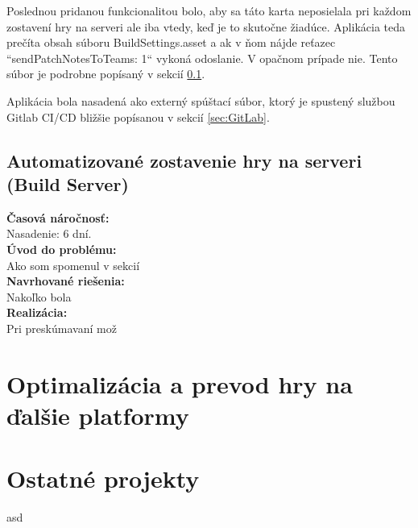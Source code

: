 \documentclass[slovak, bachelorpractice]{diploma}
\begin{document}
Poslednou pridanou funkcionalitou bolo, aby sa táto karta neposielala pri každom zostavení hry na serveri ale iba vtedy, keď je to skutočne žiadúce. Aplikácia teda prečíta obsah súboru BuildSettings.asset a ak v ňom nájde reťazec ``sendPatchNotesToTeams: 1`` vykoná odoslanie. V opačnom prípade nie. Tento súbor je podrobne popísaný v sekcií \ref{sec:BuildServer}.

Aplikácia bola nasadená ako externý spúštací súbor, ktorý je spustený službou Gitlab CI/CD bližšie popísanou v sekcií \ref{sec:GitLab}.
\subsection{Automatizované zostavenie hry na serveri (Build Server)}
\label{sec:BuildServer}
\textbf{Časová náročnosť:} \\ Nasadenie: 6 dní.\\
\textbf{Úvod do problému:} \\ Ako som spomenul v sekcií \\
\textbf{Navrhované riešenia:} \\ Nakoľko bola \\
\textbf{Realizácia:} \\ Pri preskúmavaní mož
\section{Optimalizácia a prevod hry na ďalšie platformy}
\label{sec:Port}
\section{Ostatné projekty}
\label{sec:Others}
asd



\printbibliography[title={Literatúra}, heading=bibintoc]
\end{document}
